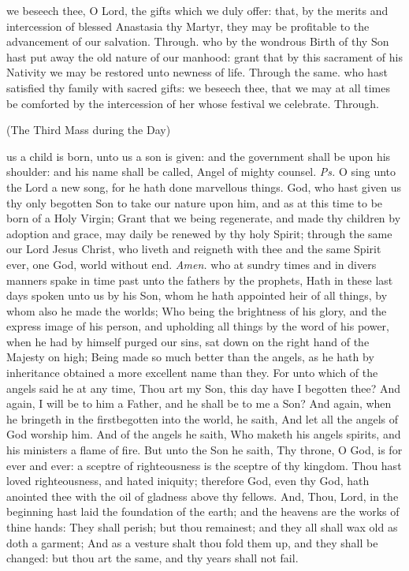  we beseech thee, O Lord, the gifts which we duly offer: that, by the merits and intercession of blessed Anastasia thy Martyr, they may be profitable to the advancement of our salvation. Through.
\postcommunion
{} who by the wondrous Birth of thy Son hast put away the old nature of our manhood: grant that by this sacrament of his Nativity we may be restored unto newness of life. Through the same.
 who hast satisfied thy family with sacred gifts: we beseech thee, that we may at all times be comforted by the intercession of her whose festival we celebrate. Through.

\label{NativityMassIII}
\centerline{\small{(The Third Mass during the Day)}}
\introit
{} us a child is born, unto us a son is given: and the government shall be upon his shoulder: and his name shall be called, Angel of mighty counsel. \textit{Ps.} O sing unto the Lord a new song, for he hath done marvellous things.
\collect\label{NativityMassIIICollect}
 God, who hast given us thy only begotten Son to take our nature upon him, and as at this time to be born of a Holy Virgin; Grant that we being regenerate, and made thy children by adoption and grace, may daily be renewed by thy holy Spirit; through the same our Lord Jesus Christ, who liveth and reigneth with thee and the same Spirit ever, one God, world without end. \textit{Amen.}
 who at sundry times and in divers manners spake in time past unto the fathers by the prophets, Hath in these last days spoken unto us by his Son, whom he hath appointed heir of all things, by whom also he made the worlds; Who being the brightness of his glory, and the express image of his person, and upholding all things by the word of his power, when he had by himself purged our sins, sat down on the right hand of the Majesty on high; Being made so much better than the angels, as he hath by inheritance obtained a more excellent name than they. For unto which of the angels said he at any time, Thou art my Son, this day have I begotten thee? And again, I will be to him a Father, and he shall be to me a Son? And again, when he bringeth in the firstbegotten into the world, he saith, And let all the angels of God worship him. And of the angels he saith, Who maketh his angels spirits, and his ministers a flame of fire. But unto the Son he saith, Thy throne, O God, is for ever and ever: a sceptre of righteousness is the sceptre of thy kingdom. Thou hast loved righteousness, and hated iniquity; therefore God, even thy God, hath anointed thee with the oil of gladness above thy fellows. And, Thou, Lord, in the beginning hast laid the foundation of the earth; and the heavens are the works of thine hands: They shall perish; but thou remainest; and they all shall wax old as doth a garment; And as a vesture shalt thou fold them up, and they shall be changed: but thou art the same, and thy years shall not fail.
